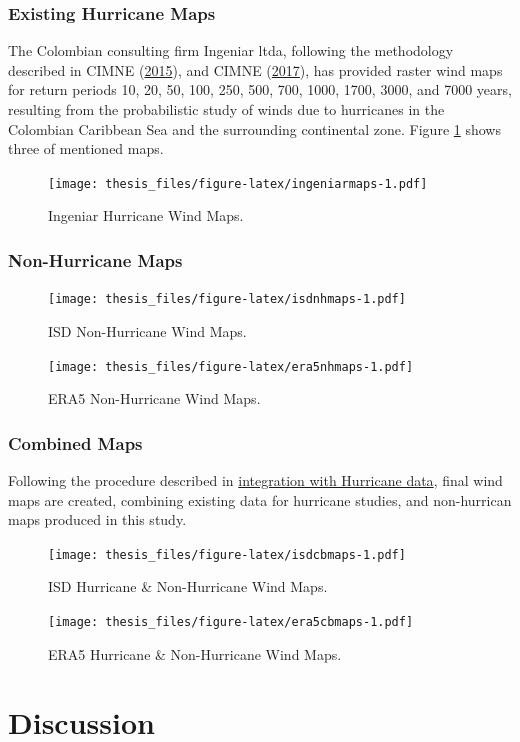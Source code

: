 \documentclass[12pt,oneside]{reedthesis}
\begin{document}
\hypertarget{existing-hurricane-maps}{%
\subsection{Existing Hurricane Maps}\label{existing-hurricane-maps}}

The Colombian consulting firm Ingeniar ltda, following the methodology described in CIMNE (\protect\hyperlink{ref-hurricanemaps}{2015}), and CIMNE (\protect\hyperlink{ref-hurricanemaps2}{2017}), has provided raster wind maps for return periods 10, 20, 50, 100, 250, 500, 700, 1000, 1700, 3000, and 7000 years, resulting from the probabilistic study of winds due to hurricanes in the Colombian Caribbean Sea and the surrounding continental zone. Figure \ref{fig:ingeniarmaps} shows three of mentioned maps.
\begin{figure}
\centering
\texttt{[image: thesis\_files/figure-latex/ingeniarmaps-1.pdf]}
\caption{\label{fig:ingeniarmaps}Ingeniar Hurricane Wind Maps.}
\end{figure}
\hypertarget{non-hurricane-maps}{%
\subsection{Non-Hurricane Maps}\label{non-hurricane-maps}}
\begin{figure}
\centering
\texttt{[image: thesis\_files/figure-latex/isdnhmaps-1.pdf]}
\caption{\label{fig:isdnhmaps}ISD Non-Hurricane Wind Maps.}
\end{figure}
\begin{figure}
\centering
\texttt{[image: thesis\_files/figure-latex/era5nhmaps-1.pdf]}
\caption{\label{fig:era5nhmaps}ERA5 Non-Hurricane Wind Maps.}
\end{figure}
\hypertarget{combined-maps}{%
\subsection{Combined Maps}\label{combined-maps}}

Following the procedure described in \protect\hyperlink{integration}{integration with Hurricane data}, final wind maps are created, combining existing data for hurricane studies, and non-hurrican maps produced in this study.
\begin{figure}
\centering
\texttt{[image: thesis\_files/figure-latex/isdcbmaps-1.pdf]}
\caption{\label{fig:isdcbmaps}ISD Hurricane \& Non-Hurricane Wind Maps.}
\end{figure}
\begin{figure}
\centering
\texttt{[image: thesis\_files/figure-latex/era5cbmaps-1.pdf]}
\caption{\label{fig:era5cbmaps}ERA5 Hurricane \& Non-Hurricane Wind Maps.}
\end{figure}
\hypertarget{rmd-discussion}{%
\chapter{Discussion}\label{rmd-discussion}}
\end{document}
